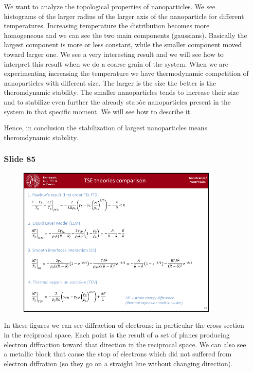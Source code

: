 \documentclass[../main/main.tex]{subfiles}
\begin{document}
We want to analyze the topological properties of nanoparticles. We see histograms of the larger radius of the larger axis of the nanoparticle for different temperatures.
Increasing temperature the distribution becomes more homogeneous and we can see the two main components (gaussians).
Basically the largest component is more or less constant, while the smaller component moved toward larger one. We see a very interesting result and we will see how to interpret this result when we do a coarse grain of the system.
When we are experimenting increasing the temperature we have thermodynamic competition of nanoparticles with different size. The larger is the size the better is the theromdynamic stability.
The smaller nanoparticles tends to increase their size and to stabilize even further the already stabòe nanoparticles present in the system in that specific moment. We will see how to describe it.

Hence, in conclusion the stabilization of largest nanoparticles means theromdynamic stability.

\newpage

\subsubsection{Slide 85}

\begin{figure}[h!]
\centering
\includegraphics[page=4,width=0.9\textwidth]{../lessons/pdf_file/5_lesson.pdf}
\end{figure}

In these figures we can see diffraction of electrons: in particular the cross section in the reciprocal space. Each point is the result of a set of planes producing electron diffraction toward that direction in the reciprocal space.
We can also see a metallic block that cause the stop of electrons which did not suffered from electron diffration (so they go on a straight line without changing direction).
\end{document}
